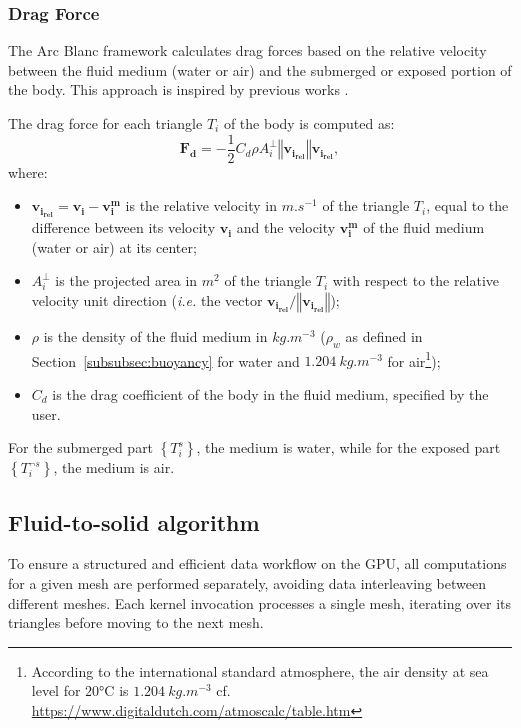 \documentclass[final]{jcgt}
\def\Framework{The Arc Blanc framework\xspace}
\def\ie{\emph{i.e.}\xspace}
\begin{document}
\subsubsection{Drag Force}
\label{subsubsec:dragForce}
\Framework calculates drag forces based on the relative velocity between the fluid medium (water or air) and the submerged or exposed portion of the body. This approach is inspired by previous works \cite{yukselRealtimeWaterWaves2010,kellomakiRigidBodyInteraction2014,kernerWaterInteractionModel2016}.

The drag force for each triangle $T_i$ of the body is computed as:
\begin{equation}
	\mathbf{F_d}= -\frac{1}{2} C_d \rho A_i^{\perp} \left\Vert\mathbf{v_{i_{rel}}}\right\Vert\mathbf{v_{i_{rel}}},
\end{equation}
where:
\begin{itemize}
	\item $\mathbf{v_{i_{rel}}}=\mathbf{v_i}-\mathbf{v_{i}^{m}}$ is the relative velocity in $m.s^{-1}$ of the triangle $T_i$, equal to the difference between its velocity $\mathbf{v_i}$ and the velocity $\mathbf{v_{i}^{m}}$ of the fluid medium (water or air) at its center;
	\item $A_i^{\perp}$ is the projected area in $m^2$ of the triangle $T_i$ with respect to the relative velocity unit direction (\ie the vector $\mathbf{v_{i_{rel}}}/\left\Vert\mathbf{v_{i_{rel}}}\right\Vert$);
	\item $\rho$ is the density of the fluid medium in $kg.m^{-3}$ ($\rho_w$ as defined in Section~\ref{subsubsec:buoyancy} for water and $1.204~kg.m^{-3}$  for air\footnote{According to the international standard atmosphere, the air density at sea level for $20$°C is $1.204~kg.m^{-3}$ cf. \url{https://www.digitaldutch.com/atmoscalc/table.htm}});
	\item $C_d$ is the drag coefficient of the body in the fluid medium, specified by the user.
\end{itemize}

For the submerged part $\left\lbrace T_i^s\right\rbrace$, the medium is water, while for the exposed part $\left\lbrace T_i^{\neg s}\right\rbrace$, the medium is air.


\subsection{Fluid-to-solid algorithm}
\label{subsec:algoForces}


To ensure a structured and efficient data workflow on the GPU, all computations for a given mesh are performed separately, avoiding data interleaving between different meshes. Each kernel invocation processes a single mesh, iterating over its triangles before moving to the next mesh.
\end{document}
